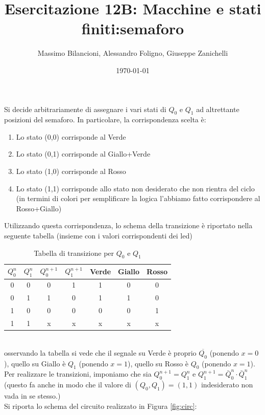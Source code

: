 \documentclass[10pt,a4paper]{article}
\date{\today}
\title{Esercitazione 12B: Macchine e stati finiti:semaforo}
\author{Massimo Bilancioni, Alessandro Foligno, Giuseppe Zanichelli}
\begin{document}
	
\maketitle
Si decide arbitrariamente di assegnare i vari stati di $Q_0$ e $Q_1$ ad altrettante posizioni del semaforo. In particolare, la corrispondenza scelta è:\\
\begin{enumerate}
	\item Lo stato (0,0) corrisponde al Verde
	\item Lo stato (0,1) corrisponde al Giallo+Verde
	\item Lo stato (1,0) corrisponde al Rosso
	\item Lo stato (1,1) corrisponde allo stato non desiderato che non rientra del ciclo (in termini di colori per semplificare la  logica  l'abbiamo fatto corrispondere al Rosso+Giallo)
\end{enumerate}
Utilizzando questa corrispondenza, lo schema della transizione è riportato nella seguente tabella (insieme con i valori corrispondenti dei led)\
\begin{table}[h]\centering
\begin{tabular}{|c|c|c|c|c|c|c|}
	\hline 
	$Q_0^n$ & $Q_1^n$ & $Q_0^{n+1}$ & $Q_1^{n+1}$ & Verde & Giallo & Rosso \\ 
	\hline 
	0 & 0 & 0 & 1 & 1 & 0 & 0 \\ 
	\hline 
	0 & 1 & 1 & 0 & 1 & 1 & 0 \\ 
	\hline 
	1 & 0 & 0 & 0 & 0 & 0 & 1 \\ 
	\hline 
	1 & 1 & x & x & x & x & x \\ 
	\hline 
\end{tabular} 	
\caption{Tabella di transizione per $Q_0$ e $Q_1$}
\end{table}
\\
osservando la tabella si vede che il segnale su Verde è proprio $\overline{Q_0}$ (ponendo $x =0$), quello su Giallo è $Q_1$ (ponendo $x= 1$), quello su Rosso è $Q_0$ (ponendo $x= 1$).\\
Per realizzare le transizioni, imponiamo che sia $Q_0^{n+1}=Q_1^n$ e $Q_1^{n+1}=\bar{Q}_0^n \cdot \bar{Q}_1^n$ (questo fa anche in modo che il valore di $(Q_0,Q_1)=(1,1)$ indesiderato non vada in se stesso.)\\
Si riporta lo schema del circuito realizzato in Figura \ref{fig:circ}:
\end{document}
